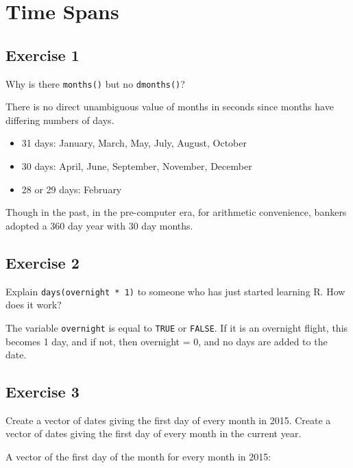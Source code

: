 \documentclass[]{book}
\providecommand{\tightlist}{%
  \setlength{\itemsep}{0pt}\setlength{\parskip}{0pt}}
\theoremstyle{plain}
\theoremstyle{remark}
\theoremstyle{definition}
\theoremstyle{definition}
\theoremstyle{definition}
\theoremstyle{remark}
\begin{document}
\hypertarget{time-spans}{%
\section{Time Spans}\label{time-spans}}

\hypertarget{exercise-1-48}{%
\subsection{Exercise 1}\label{exercise-1-48}}

Why is there \texttt{months()} but no \texttt{dmonths()}?

There is no direct unambiguous value of months in seconds since months
have differing numbers of days.

\begin{itemize}
\tightlist
\item
  31 days: January, March, May, July, August, October
\item
  30 days: April, June, September, November, December
\item
  28 or 29 days: February
\end{itemize}

Though in the past, in the pre-computer era, for arithmetic convenience,
bankers adopted a 360 day year with 30 day months.

\hypertarget{exercise-2-46}{%
\subsection{Exercise 2}\label{exercise-2-46}}

Explain \texttt{days(overnight\ *\ 1)} to someone who has just started
learning R. How does it work?

The variable \texttt{overnight} is equal to \texttt{TRUE} or
\texttt{FALSE}. If it is an overnight flight, this becomes 1 day, and if
not, then overnight = 0, and no days are added to the date.

\hypertarget{exercise-3-36}{%
\subsection{Exercise 3}\label{exercise-3-36}}

Create a vector of dates giving the first day of every month in 2015.
Create a vector of dates giving the first day of every month in the
current year.

A vector of the first day of the month for every month in 2015:
\end{document}
